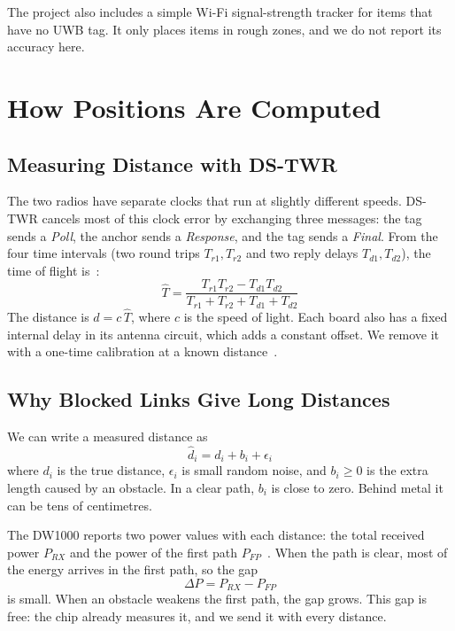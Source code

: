 \documentclass[conference]{IEEEtran}
\begin{document}
The project also includes a simple Wi-Fi signal-strength tracker for items
that have no UWB tag. It only places items in rough zones, and we do not
report its accuracy here.

\section{How Positions Are Computed}

\subsection{Measuring Distance with DS-TWR}
The two radios have separate clocks that run at slightly different speeds.
DS-TWR cancels most of this clock error by exchanging three messages: the
tag sends a \emph{Poll}, the anchor sends a \emph{Response}, and the tag
sends a \emph{Final}. From the four time intervals (two round trips
$T_{r1}, T_{r2}$ and two reply delays $T_{d1}, T_{d2}$), the time of flight
is~\cite{neirynck2016alternative}:
\begin{equation}
\hat{T} = \frac{T_{r1} T_{r2} - T_{d1} T_{d2}}{T_{r1} + T_{r2} + T_{d1} + T_{d2}}
\end{equation}
The distance is $\hat{d} = c\,\hat{T}$, where $c$ is the speed of light.
Each board also has a fixed internal delay in its antenna circuit, which
adds a constant offset. We remove it with a one-time calibration at a known
distance~\cite{aps014}.

\subsection{Why Blocked Links Give Long Distances}
We can write a measured distance as
\begin{equation}
\hat{d}_i = d_i + b_i + \epsilon_i
\end{equation}
where $d_i$ is the true distance, $\epsilon_i$ is small random noise, and
$b_i \ge 0$ is the extra length caused by an obstacle. In a clear path,
$b_i$ is close to zero. Behind metal it can be tens of centimetres.

The DW1000 reports two power values with each distance: the total received
power $P_{RX}$ and the power of the first path $P_{FP}$~\cite{dw1000usermanual}.
When the path is clear, most of the energy arrives in the first path, so
the gap
\begin{equation}
\Delta P = P_{RX} - P_{FP}
\end{equation}
is small. When an obstacle weakens the first path, the gap grows. This gap
is free: the chip already measures it, and we send it with every distance.
\end{document}
